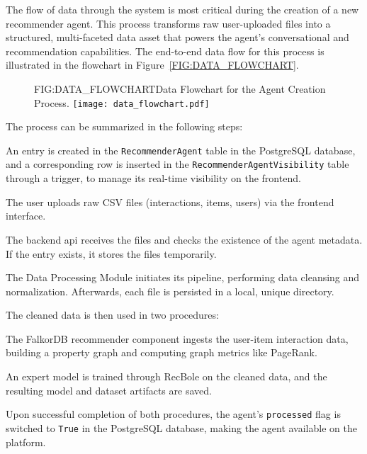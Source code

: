 The flow of data through the system is most critical during the creation of a new recommender agent. This process transforms raw user-uploaded files into a structured, multi-faceted data asset that powers the agent's conversational and recommendation capabilities. The end-to-end data flow for this process is illustrated in the flowchart in Figure~\ref{FIG:DATA_FLOWCHART}.

\begin{figure}[Data Flowchart]{FIG:DATA_FLOWCHART}{Data Flowchart for the Agent Creation Process.}
    \centering
    \texttt{[image: data\_flowchart.pdf]}
\end{figure}

The process can be summarized in the following steps:
\begin{compactenum}
    \item An entry is created in the \texttt{RecommenderAgent} table in the PostgreSQL database, and a corresponding row is inserted in the \texttt{RecommenderAgentVisibility} table through a trigger, to manage its real-time visibility on the frontend.
    \item The user uploads raw CSV files (interactions, items, users) via the frontend interface.
    \item The backend \acs{api} receives the files and checks the existence of the agent metadata. If the entry exists, it stores the files temporarily.
    \item The Data Processing Module initiates its pipeline, performing data cleansing and normalization. Afterwards, each file is persisted in a local, unique directory.
    \item The cleaned data is then used in two procedures:
    \begin{compactenum}
        \item The FalkorDB recommender component ingests the user-item interaction data, building a property graph and computing graph metrics like PageRank.
        \item An expert model \cite{EASER} is trained through RecBole on the cleaned data, and the resulting model and dataset artifacts are saved.
    \end{compactenum}
    \item Upon successful completion of both procedures, the agent's \texttt{processed} flag is switched to \texttt{True} in the PostgreSQL database, making the agent available on the platform.
\end{compactenum}
